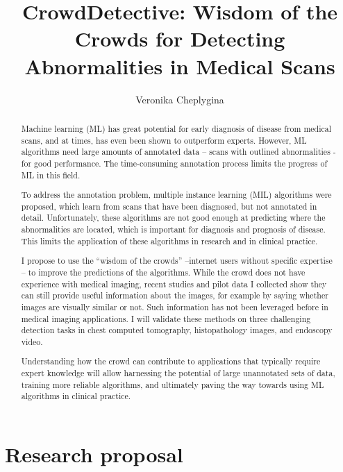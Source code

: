 \documentclass[serif, twocolumn, numeric, rga]{jote-article}
\title{CrowdDetective: Wisdom of the Crowds for Detecting Abnormalities in Medical Scans}
\author[1]{Veronika Cheplygina}
\affil[1]{Medical Image Analysis, Department of Biomedical Engineering, Eindhoven University of Technology, Eindhoven, 5612 AZ, the Netherlands}
\begin{document}
\setcounter{page}{59}
\begin{frontmatter}
\maketitle 
\begin{abstract}
Machine learning (ML) has great potential for early diagnosis of disease from medical scans, and at times, has even been shown to outperform experts. However, ML algorithms need large amounts of annotated data -- scans with outlined abnormalities - for good performance. The time-consuming annotation process limits the progress of ML in this field.

To address the annotation problem, multiple instance learning (MIL) algorithms were proposed, which learn from scans that have been diagnosed, but not annotated in detail. Unfortunately, these algorithms are not good enough at predicting where the abnormalities are located, which is important for diagnosis and prognosis of disease. This limits the application of these algorithms in research and in clinical practice.

I propose to use the ``wisdom of the crowds'' --internet users without specific expertise -- to improve the predictions of the algorithms.
While the crowd does not have experience with medical imaging, recent studies and pilot data I collected show they can still provide useful information about the images, for example by saying whether images are visually similar or not. Such information has not been leveraged before in medical imaging applications. I will validate these methods on three challenging detection tasks in chest computed tomography, histopathology images, and endoscopy video.

Understanding how the crowd can contribute to applications that typically require expert knowledge will allow harnessing the potential of large unannotated sets of data, training more reliable algorithms, and ultimately paving the way towards using ML algorithms in clinical practice.
\end{abstract}
\end{frontmatter}

\section*{Research proposal}
\vspace{\baselineskip}
\end{document}
